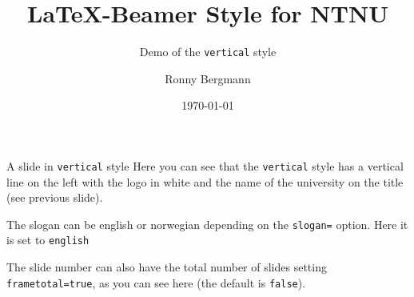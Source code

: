 \documentclass[aspectratio=169]{beamer}
\title{\LaTeX{}-Beamer Style for NTNU}
\subtitle{Demo of the  \texttt{vertical} style}
\author{Ronny Bergmann}
\date{\today}
\begin{document}
	\maketitle
		\begin{frame}[fragile]{A slide in \texttt{vertical} style}
			Here you can see that the \texttt{vertical} style has a vertical line on the left with the logo in white and the name of the university on the title (see previous slide).

			The slogan can be english or norwegian depending on the \lstinline!slogan=! option. Here it is set to \lstinline!english!

			The slide number can also have the total number of slides setting \lstinline!frametotal=true!,
            as you can see here (the default is \lstinline!false!).
		\end{frame}
\end{document}
